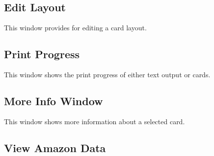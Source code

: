 \subsection{Edit Layout}
This window provides for editing a card layout.
\subsection{Print Progress}
This window shows the print progress of either text output or cards.
\subsection{More Info Window}
This window shows more information about a selected card.
\subsection{View Amazon Data}
\label{sect:ref:viewamazondata}

